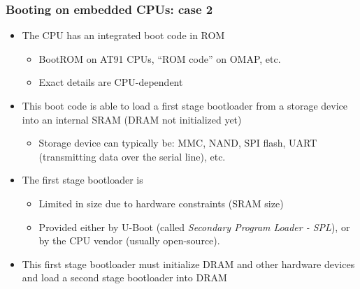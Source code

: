 \begin{frame}
  \frametitle{Booting on embedded CPUs: case 2}
  \begin{itemize}
  \item The CPU has an integrated boot code in ROM
    \begin{itemize}
    \item BootROM on AT91 CPUs, “ROM code” on OMAP, etc.
    \item Exact details are CPU-dependent
    \end{itemize}
  \item This boot code is able to load a first stage bootloader from a
    storage device into an internal SRAM (DRAM not initialized yet)
    \begin{itemize}
    \item Storage device can typically be: MMC, NAND, SPI flash, UART
          (transmitting data over the serial line), etc.
    \end{itemize}
  \item The first stage bootloader is
    \begin{itemize}
    \item Limited in size due to hardware constraints (SRAM size)
    \item Provided either by U-Boot (called {\em Secondary Program Loader
          - SPL}), or by the CPU vendor (usually open-source).
    \end{itemize}
  \item This first stage bootloader must initialize DRAM and other
    hardware devices and load a second stage bootloader into DRAM
  \end{itemize}
\end{frame}


